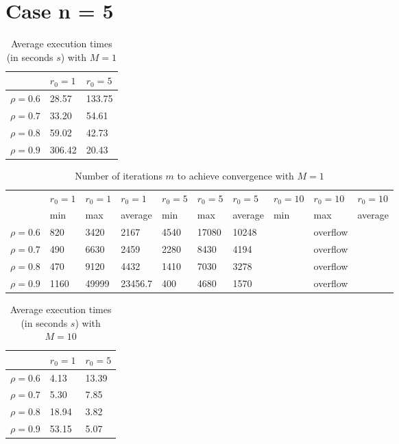 \documentclass[a4paper,11pt,openright]{report}
\begin{document}
\section*{Case n = 5} 
\begin{table}[H]
\centering
\addtolength{\leftskip}{-1.5cm}
\addtolength{\rightskip}{-1.5cm}
\begin{tabular}{|c|ll|}
\hline
$ $ & $r_0 = 1$ & $r_0 = 5$ \\
\hline
$\rho = 0.6$ & 28.57 & 133.75 \\

$\rho = 0.7$ & 33.20 & 54.61 \\

$\rho = 0.8$ & 59.02 & 42.73 \\

$\rho = 0.9$ &  306.42 & 20.43 \\
\hline
\end{tabular}
\caption{Average execution
 times (in seconds $s$) with $M = 1$}
\end{table}
\begin{table}[H]
\centering
\addtolength{\leftskip}{-1.5cm}
\addtolength{\rightskip}{-1.5cm}
\begin{tabular}{|c|lllllllll|}
\hline
$ $ & $r_0 = 1$ & $r_0 = 1$ & $r_0 = 1$ & $r_0 = 5$ & $r_0 = 5$ & $r_0 = 5$ & $r_0 = 10$ & $r_0 = 10$ & $r_0 = 10$  \\
$ $ & min & max & average & min & max & average & min & max & average \\ 
\hline
$\rho = 0.6$ & 820 & 3420 & 2167 & 4540 & 17080 & 10248 &  & overflow &  \\

$\rho = 0.7$ & 490 & 6630 & 2459 & 2280 & 8430 & 4194 &  & overflow &  \\

$\rho = 0.8$ & 470 & 9120 & 4432 & 1410 & 7030 & 3278 &  & overflow & \\

$\rho = 0.9$ & 1160 & 49999 & 23456.7 & 400 & 4680 & 1570 &  & overflow & \\
\hline
\end{tabular}
\caption{Number of iterations $m$ to achieve convergence with $M = 1$}
\end{table}
\begin{table}[H]
\centering
\addtolength{\leftskip}{-1.5cm}
\addtolength{\rightskip}{-1.5cm}
\begin{tabular}{|c|ll|}
\hline
$ $ & $r_0 = 1$ & $r_0 = 5$ \\
\hline
$\rho = 0.6$ & 4.13 & 13.39 \\

$\rho = 0.7$ & 5.30 & 7.85  \\

$\rho = 0.8$ & 18.94 & 3.82 \\

$\rho = 0.9$ & 53.15 & 5.07 \\
\hline
\end{tabular}
\caption{Average execution
 times (in seconds $s$) with $M = 10$}
\end{table}
\end{document}
